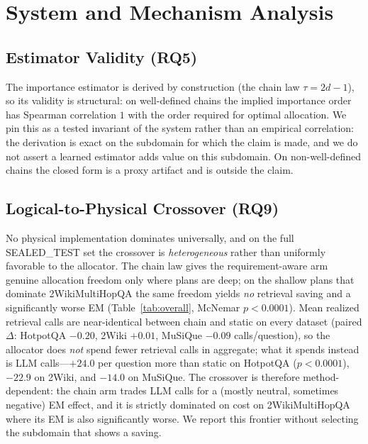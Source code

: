 \section{System and Mechanism Analysis}
\label{sec:mechanism}

\subsection{Estimator Validity (RQ5)}
The importance estimator is derived by construction (the chain law
$\tau = 2d-1$), so its validity is structural: on well-defined chains the
implied importance order has Spearman correlation $1$ with the order required
for optimal allocation. We pin this as a tested invariant of the system rather
than an empirical correlation: the derivation is exact on the subdomain for
which the claim is made, and we do not assert a learned estimator adds value on
this subdomain. On non-well-defined chains the closed form is a proxy artifact
and is outside the claim.

\subsection{Logical-to-Physical Crossover (RQ9)}
\label{subsec:crossover}
No physical implementation dominates universally, and on the full
SEALED\_TEST set the crossover is \emph{heterogeneous} rather than uniformly
favorable to the allocator. The chain law gives the requirement-aware arm
genuine allocation freedom only where plans are deep; on the shallow plans that
dominate 2WikiMultiHopQA the same freedom yields \emph{no} retrieval saving and
a significantly worse EM (Table~\ref{tab:overall}, McNemar
$p<0.0001$). Mean realized retrieval calls are near-identical between chain and
static on every dataset (paired $\Delta$: HotpotQA $-0.20$, 2Wiki $+0.01$,
MuSiQue $-0.09$ calls/question), so the allocator does \emph{not} spend fewer
retrieval calls in aggregate; what it spends instead is LLM calls---$+24.0$
per question more than static on HotpotQA ($p<0.0001$), $-22.9$ on 2Wiki, and
$-14.0$ on MuSiQue. The crossover is therefore method-dependent: the chain arm
trades LLM calls for a (mostly neutral, sometimes negative) EM effect, and it
is strictly dominated on cost on 2WikiMultiHopQA where its EM is also
significantly worse. We report this frontier without selecting the subdomain
that shows a saving.

